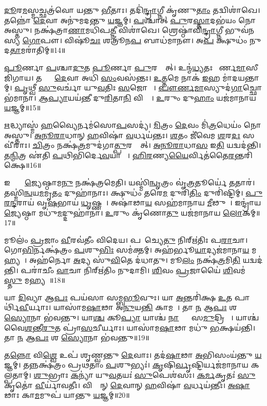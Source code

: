 \ul{𑌦𑍂}𑌰\ul{𑌮}𑌸𑍍𑌮𑌚𑍍𑌛𑌤𑍍𑌰॑𑌵𑍋 𑌯𑌨𑍍𑌤𑍁 \ul{𑌭𑍀}𑌤𑌾𑌃।
𑌤𑌦𑌿॑\ul{𑌨𑍍𑌦𑍍𑌰𑌾}𑌗𑍍𑌨𑍀 𑌕𑍃॑𑌣𑍁\ul{𑌤𑌾𑌂} 𑌤𑌦𑍍𑌵𑌿𑌶𑌾॑𑌖𑍇।
𑌤𑌨𑍍𑌨𑍋॑ \ul{𑌦𑍇}𑌵𑌾 𑌅𑌨𑍁॑𑌮𑌦𑌨𑍍𑌤𑍁 \ul{𑌯}𑌜𑍍𑌞𑌮𑍍।
\ul{𑌪}𑌶𑍍𑌚𑌾𑌤𑍍 \ul{𑌪𑍁}𑌰\ul{𑌸𑍍𑌤𑌾}𑌦𑌭॑𑌯𑌂 𑌨𑍋 𑌅𑌸𑍍𑌤𑍁।
𑌨𑌕𑍍𑌷॑𑌤𑍍𑌰𑌾\ul{𑌣𑌾}𑌮𑌧𑌿॑𑌪\ul{𑌤𑍍𑌨𑍀} 𑌵𑌿𑌶𑌾॑𑌖𑍇।
𑌶𑍍𑌰𑍇𑌷𑍍𑌠𑌾॑𑌵𑌿\ul{𑌨𑍍𑌦𑍍𑌰𑌾}𑌗𑍍𑌨𑍀 𑌭𑍁𑌵॑𑌨𑌸𑍍𑌯 \ul{𑌗𑍋}𑌪𑍗।
𑌵𑌿𑌷𑍂॑\ul{𑌚𑌃} 𑌶𑌤𑍍𑌰𑍂॑𑌨\ul{𑌪} 𑌬𑌾𑌧॑𑌮𑌾𑌨𑍗।
𑌅\ul{𑌪} 𑌕𑍍𑌷𑍁𑌧𑌂॑ 𑌨𑍁𑌦\ul{𑌤𑌾}𑌮𑌰𑌾॑𑌤𑌿𑌮𑍍॥14॥ 

\ul{𑌪𑍂}𑌰𑍍𑌣𑌾 \ul{𑌪}𑌶𑍍𑌚𑌾\ul{𑌦𑍁}𑌤 \ul{𑌪𑍂}𑌰𑍍𑌣𑌾 \ul{𑌪𑍁}𑌰𑌸𑍍𑌤𑌾᳚𑌤𑍍।
𑌉𑌨𑍍𑌮॑\ul{𑌧𑍍𑌯}𑌤𑌃 𑌪𑍗᳚𑌰𑍍𑌣\ul{𑌮𑌾}𑌸𑍀 𑌜𑌿॑𑌗𑌾𑌯।
𑌤𑌸𑍍𑌯𑌾𑌂᳚ \ul{𑌦𑍇}𑌵𑌾 𑌅𑌧𑌿॑ \ul{𑌸𑌂}𑌵𑌸॑𑌨𑍍𑌤𑌃।
\ul{𑌉}\ul{𑌤𑍍𑌤}𑌮𑍇 𑌨𑌾𑌕॑ \ul{𑌇}𑌹 𑌮𑌾॑𑌦𑌯𑌨𑍍𑌤𑌾𑌮𑍍।
\ul{𑌪𑍃}𑌥𑍍𑌵𑍀 \ul{𑌸𑍁}𑌵𑌰𑍍𑌚𑌾॑ 𑌯𑍁\ul{𑌵}𑌤𑌿𑌃 \ul{𑌸}𑌜𑍋𑌷𑌾𑌃᳚।
\ul{𑌪𑍗}\ul{𑌰𑍍𑌣}\ul{𑌮𑌾}𑌸𑍍𑌯𑍁𑌦॑\ul{𑌗𑌾}𑌚𑍍𑌛𑍋𑌭॑𑌮𑌾𑌨𑌾।
\ul{𑌆}\ul{𑌪𑍍𑌯𑌾}𑌯𑌯॑𑌨𑍍𑌤𑍀 𑌦𑍁\ul{𑌰𑌿}𑌤𑌾\ul{𑌨𑌿} 𑌵𑌿𑌶𑍍𑌵𑌾᳚।
\ul{𑌉}𑌰𑍁𑌂 𑌦𑍁\ul{𑌹𑌾𑌂} 𑌯𑌜॑𑌮𑌾𑌨𑌾𑌯 \ul{𑌯}𑌜𑍍𑌞𑌮𑍍॥15॥ 

\ul{𑌋}𑌦𑍍𑌧𑍍𑌯𑌾𑌸𑍍𑌮॑ \ul{𑌹}𑌵𑍍𑌯𑍈𑌰𑍍𑌨𑌮॑𑌸𑍋\ul{𑌪}𑌸𑌦𑍍𑌯॑।
\ul{𑌮𑌿}𑌤𑍍𑌰𑌂 \ul{𑌦𑍇}𑌵𑌂 𑌮𑌿॑\ul{𑌤𑍍𑌰}𑌧𑍇𑌯𑌂॑ 𑌨𑍋 𑌅𑌸𑍍𑌤𑍁।
\ul{𑌅}\ul{𑌨𑍂}\ul{𑌰𑌾}𑌧𑌾𑌨𑍍 \ul{𑌹}𑌵𑌿𑌷𑌾॑ \ul{𑌵}𑌰𑍍𑌧𑌯॑𑌨𑍍𑌤𑌃।
\ul{𑌶}𑌤𑌂 𑌜𑍀॑𑌵𑍇𑌮 \ul{𑌶}𑌰\ul{𑌦𑌃} 𑌸𑌵𑍀॑𑌰𑌾𑌃।
\ul{𑌚𑌿}𑌤𑍍𑌰𑌂 𑌨𑌕𑍍𑌷॑\ul{𑌤𑍍𑌰}𑌮𑍁𑌦॑𑌗𑌾\ul{𑌤𑍍𑌪𑍁}𑌰𑌸𑍍𑌤𑌾᳚𑌤𑍍।
\ul{𑌅}\ul{𑌨𑍂}\ul{𑌰𑌾}𑌧𑌾\ul{𑌸} 𑌇\ul{𑌤𑌿} 𑌯𑌦𑍍𑌵𑌦॑𑌨𑍍𑌤𑌿।
𑌤\ul{𑌨𑍍𑌮𑌿}𑌤𑍍𑌰 𑌏॑𑌤𑌿 \ul{𑌪}𑌥𑌿𑌭𑌿॑𑌰𑍍𑌦𑍇\ul{𑌵}𑌯𑌾𑌨𑍈𑌃᳚।
\ul{𑌹𑌿}\ul{𑌰}𑌣𑍍𑌯\ul{𑌯𑍈}𑌰𑍍𑌵𑌿𑌤॑𑌤𑍈\-\ul{𑌰}𑌨𑍍𑌤𑌰𑌿॑𑌕𑍍𑌷𑍇॥16॥ 

𑌇𑌨𑍍𑌦𑍍𑌰𑍋᳚ \ul{𑌜𑍍𑌯𑍇}𑌷𑍍𑌠𑌾𑌮\ul{𑌨𑍁} 𑌨𑌕𑍍𑌷॑𑌤𑍍𑌰𑌮𑍇𑌤𑌿।
𑌯𑌸𑍍𑌮𑌿॑\ul{𑌨𑍍𑌵𑍃}𑌤𑍍𑌰𑌂 𑌵𑍃॑\ul{𑌤𑍍𑌰}𑌤𑍂𑌰𑍍𑌯𑍇॑ \ul{𑌤}𑌤𑌾𑌰॑।
𑌤𑌸𑍍𑌮𑌿॑\ul{𑌨𑍍𑌵}𑌯\ul{𑌮}𑌮𑍃\ul{𑌤𑌂} 𑌦𑍁𑌹𑌾॑𑌨𑌾𑌃।
𑌕𑍍𑌷𑍁𑌧𑌂॑ 𑌤𑌰𑍇\ul{𑌮} 𑌦𑍁𑌰𑌿॑\ul{𑌤𑌿𑌂} 𑌦𑍁𑌰𑌿॑𑌷𑍍𑌟𑌿𑌮𑍍।
\ul{𑌪𑍁}\ul{𑌰}\ul{𑌨𑍍𑌦}𑌰𑌾𑌯॑ 𑌵𑍃\ul{𑌷}𑌭𑌾𑌯॑ \ul{𑌧𑍃}𑌷𑍍𑌣𑌵𑍇᳚।
𑌅𑌷𑌾॑𑌢𑌾\ul{𑌯} 𑌸𑌹॑𑌮𑌾𑌨𑌾𑌯 \ul{𑌮𑍀}𑌢𑍁𑌷𑍇᳚।
𑌇𑌨𑍍𑌦𑍍𑌰𑌾॑𑌯 \ul{𑌜𑍍𑌯𑍇}𑌷𑍍𑌠𑌾 𑌮𑌧𑍁॑\ul{𑌮}𑌦𑍍𑌦𑍁𑌹𑌾॑𑌨𑌾।
\ul{𑌉}𑌰𑍁𑌂 𑌕𑍃॑𑌣𑍋\ul{𑌤𑍁} 𑌯𑌜॑𑌮𑌾𑌨𑌾𑌯 \ul{𑌲𑍋}𑌕𑌮𑍍॥17॥ 

𑌮𑍂𑌲𑌂॑ \ul{𑌪𑍍𑌰}𑌜𑌾𑌂 \ul{𑌵𑍀}𑌰𑌵॑𑌤𑍀𑌂 𑌵𑌿𑌦𑍇𑌯।
𑌪𑌰𑌾᳚𑌚𑍍𑌯𑍇\ul{𑌤𑍁} 𑌨𑌿𑌰𑍍\mbox{}𑌋॑𑌤𑌿𑌃 𑌪\ul{𑌰𑌾}𑌚𑌾।
𑌗𑍋\ul{𑌭𑌿}𑌰𑍍𑌨𑌕𑍍𑌷॑𑌤𑍍𑌰𑌂 \ul{𑌪}𑌶𑍁\ul{𑌭𑌿𑌃} 𑌸𑌮॑𑌕𑍍𑌤𑌮𑍍।
𑌅𑌹॑𑌰𑍍𑌭𑍂\ul{𑌯𑌾}𑌦𑍍𑌯𑌜॑𑌮𑌾𑌨𑌾\ul{𑌯} 𑌮𑌹𑍍𑌯𑌮𑍍᳚।
𑌅𑌹॑𑌰𑍍𑌨𑍋 \ul{𑌅}𑌦𑍍𑌯 𑌸𑍁॑\ul{𑌵𑌿}𑌤𑍇 𑌦॑𑌧𑌾𑌤𑍁।
𑌮𑍂\ul{𑌲𑌂} 𑌨𑌕𑍍𑌷॑\ul{𑌤𑍍𑌰}𑌮𑌿\ul{𑌤𑌿} 𑌯𑌦𑍍𑌵𑌦॑𑌨𑍍𑌤𑌿।
𑌪𑌰𑌾॑𑌚𑍀𑌂 \ul{𑌵𑌾}𑌚𑌾 𑌨𑌿𑌰𑍍\mbox{}𑌋॑𑌤𑌿𑌂 𑌨𑍁𑌦𑌾𑌮𑌿।
\ul{𑌶𑌿}𑌵𑌂 \ul{𑌪𑍍𑌰}𑌜𑌾𑌯𑍈॑ \ul{𑌶𑌿}𑌵𑌮॑\ul{𑌸𑍍𑌤𑍁} 𑌮𑌹𑍍𑌯𑌮𑍍᳚॥18॥ 

𑌯𑌾 \ul{𑌦𑌿}𑌵𑍍𑌯𑌾 𑌆\ul{𑌪𑌃} 𑌪𑌯॑𑌸𑌾 𑌸𑌮𑍍𑌬\ul{𑌭𑍂}𑌵𑍁𑌃।
𑌯𑌾 \ul{𑌅}𑌨𑍍𑌤𑌰𑌿॑𑌕𑍍𑌷 \ul{𑌉}𑌤 𑌪𑌾𑌰𑍍𑌥𑌿॑\ul{𑌵𑍀}𑌰𑍍𑌯𑌾𑌃।
𑌯𑌾𑌸𑌾॑𑌮\ul{𑌷𑌾}𑌢𑌾 𑌅॑\ul{𑌨𑍁}𑌯\ul{𑌨𑍍𑌤𑌿} 𑌕𑌾𑌮𑌮𑍍᳚।
𑌤𑌾 \ul{𑌨} 𑌆\ul{𑌪𑌃} 𑌶 \ul{𑌸𑍍𑌯𑍋}𑌨𑌾 𑌭॑𑌵𑌨𑍍𑌤𑍁।
𑌯𑌾\ul{𑌶𑍍𑌚} 𑌕𑍂\ul{𑌪𑍍𑌯𑌾} 𑌯𑌾𑌶𑍍𑌚॑ \ul{𑌨𑌾}𑌦𑍍𑌯𑌾𑌃᳚ 𑌸\ul{𑌮𑍁}𑌦𑍍𑌰𑌿𑌯𑌾𑌃᳚।
𑌯𑌾𑌶𑍍𑌚॑ 𑌵𑍈\ul{𑌶}𑌨𑍍𑌤𑍀\ul{𑌰𑍁}𑌤 𑌪𑍍𑌰𑌾॑\ul{𑌸}𑌚𑍀𑌰𑍍𑌯𑌾𑌃।
𑌯𑌾𑌸𑌾॑𑌮\ul{𑌷𑌾}𑌢𑌾 𑌮𑌧𑍁॑ \ul{𑌭}𑌕𑍍𑌷𑌯॑𑌨𑍍𑌤𑌿।
𑌤𑌾 \ul{𑌨} 𑌆\ul{𑌪𑌃} 𑌶 \ul{𑌸𑍍𑌯𑍋}𑌨𑌾 𑌭॑𑌵𑌨𑍍𑌤𑍁॥19॥ 

𑌤\ul{𑌨𑍍𑌨𑍋} 𑌵𑌿\ul{𑌶𑍍𑌵𑍇} 𑌉𑌪॑ 𑌶𑍃𑌣𑍍𑌵𑌨𑍍𑌤𑍁 \ul{𑌦𑍇}𑌵𑌾𑌃।
𑌤𑌦॑\ul{𑌷𑌾}𑌢𑌾 \ul{𑌅}𑌭𑌿𑌸𑌂𑌯॑𑌨𑍍𑌤𑍁 \ul{𑌯}𑌜𑍍𑌞𑌮𑍍।
𑌤𑌨𑍍𑌨𑌕𑍍𑌷॑𑌤𑍍𑌰𑌂 𑌪𑍍𑌰𑌥𑌤𑌾𑌂 \ul{𑌪}𑌶𑍁𑌭𑍍𑌯𑌃॑।
\ul{𑌕𑍃}𑌷𑌿\ul{𑌰𑍍𑌵𑍃}𑌷𑍍𑌟𑌿𑌰𑍍𑌯𑌜॑𑌮𑌾𑌨𑌾𑌯 𑌕𑌲𑍍𑌪𑌤𑌾𑌮𑍍।
\ul{𑌶𑍁}𑌭𑍍𑌰𑌾𑌃 \ul{𑌕}𑌨𑍍𑌯𑌾॑ 𑌯𑍁\ul{𑌵}𑌤𑌯𑌃॑ \ul{𑌸𑍁}𑌪𑍇𑌶॑𑌸𑌃।
\ul{𑌕}\ul{𑌰𑍍𑌮}𑌕𑍃𑌤𑌃॑ \ul{𑌸𑍁}𑌕𑍃𑌤𑍋॑ \ul{𑌵𑍀}𑌰𑍍𑌯𑌾॑𑌵𑌤𑍀𑌃।
𑌵𑌿𑌶𑍍𑌵𑌾᳚𑌨𑍍 \ul{𑌦𑍇}𑌵𑌾𑌨𑍍 \ul{𑌹}𑌵𑌿𑌷𑌾॑ \ul{𑌵}𑌰𑍍𑌧𑌯॑𑌨𑍍𑌤𑍀𑌃।
\ul{𑌅}\ul{𑌷𑌾}𑌢𑌾𑌃 𑌕𑌾\ul{𑌮}𑌮𑍁𑌪॑ 𑌯𑌾𑌨𑍍𑌤𑍁 \ul{𑌯}𑌜𑍍𑌞𑌮𑍍॥20॥ 


